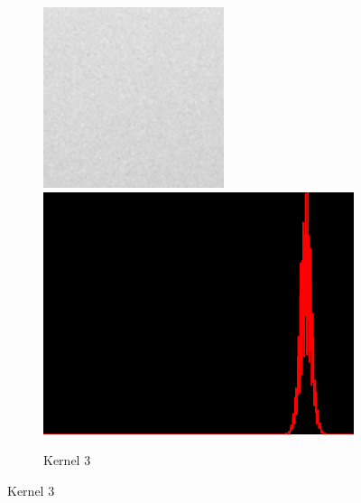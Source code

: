 \begin{figure}[H]
\begin{subfigure}[b]{0.24\textwidth}
\begin{center}
        	\text{ }
        \end{center}
        \includegraphics[width=\textwidth]{img3/rect_3_midpoint_3_final_img3.png}\\[0.1cm]
        \includegraphics[width=\textwidth]{img3/hist_rect_3_midpoint_3_final_img3.png}
        \caption{Kernel 3}
        \label{fig:img3_kernel_3}
    \end{subfigure}

\end{figure}
